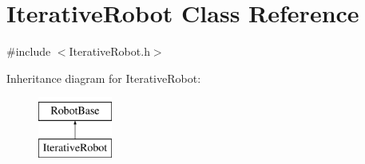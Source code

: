 \hypertarget{classIterativeRobot}{\section{\-Iterative\-Robot \-Class \-Reference}
\label{classIterativeRobot}
}


{\ttfamily \#include $<$\-Iterative\-Robot.\-h$>$}

\-Inheritance diagram for \-Iterative\-Robot\-:\begin{figure}[H]
\begin{center}
\leavevmode
\includegraphics[height=2.000000cm]{classIterativeRobot}
\end{center}
\end{figure}
